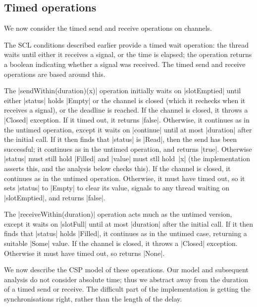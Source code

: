 
\subsection{Timed operations}
\label{sec:syncchan-timed}

\inlineScala

We now consider the timed send and receive operations on channels.  

The SCL conditions described earlier provide a timed wait operation: the
thread waits until either it receives a signal, or the time is elapsed; the
operation returns a boolean indicating whether a signal was received.  The
timed send and receive operations are based around this. 

The |sendWithin(duration)(x)| operation initially waits on |slotEmptied| until
either |status| holds |Empty| or the channel is closed (which it rechecks when
it receives a signal), or the deadline is reached.  If the channel is closed,
it throws a |Closed| exception.  If it timed out, it returns |false|.
Otherwise, it continues as in the untimed operation, except it waits on
|continue| until at most |duration| after the initial call.  If it then finds
that |status| is |Read|, then the send has been successful; it continues as in
the untimed operation, and returns |true|.  Otherwise |status| must still hold
|Filled| and |value| must stll hold~|x| (the implementation asserts this, and
the analysis below checks this).  If the channel is closed, it continues as in
the untimed operation.  Otherwise, it must have timed out, so it sets |status|
to |Empty| to clear its value, signals to any thread waiting on |slotEmptied|,
and returns |false|.

The |receiveWithin(duration)| operation acts much as the untimed version,
except it waits on |slotFull| until at most |duration| after the initial
call.  If it then finds that |status| holds |Filled|, it continues as in the
untimed case, returning a suitable |Some| value.  If the channel is closed, it
throws a |Closed| exception.  Otherwise it must have timed out, so returns
|None|.  


We now describe the CSP model of these operations.  Our model and subsequent
analysis do not consider absolute time; thus we abstract away from the
duration of a timed send or receive.  The difficult part of the implementation
is getting the synchronisations right, rather than the length of the delay.


